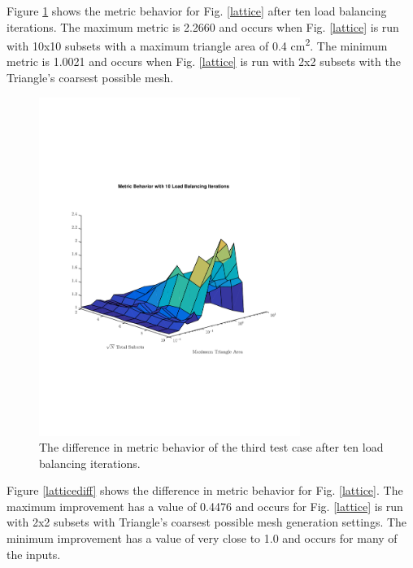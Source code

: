 \documentclass{anstrans}
\begin{document}
Figure \ref{latticeiter} shows the metric behavior for Fig. \ref{lattice} after ten load balancing iterations. The maximum metric is 2.2660 and occurs when Fig. \ref{lattice} is run with 10x10 subsets with a maximum triangle area of 0.4 cm\textsuperscript{2}. The minimum metric is 1.0021 and occurs when Fig. \ref{lattice} is run with 2x2 subsets with the Triangle's coarsest possible mesh.

\begin{figure}
\centering
\includegraphics[width=85mm, trim = 0cm 5cm 0cm 5cm,clip]{figures/lattice_iter.pdf}
\caption{The difference in metric behavior of the third test case after ten load balancing iterations.}
\label{latticeiter}
\end{figure}

Figure \ref{latticediff} shows the difference in metric behavior for Fig. \ref{lattice}. The maximum improvement has a value of 0.4476 and occurs for Fig. \ref{lattice} is run with 2x2 subsets with Triangle's coarsest possible mesh generation settings. The minimum improvement has a value of very close to 1.0 and occurs for many of the inputs. 
\end{document}
